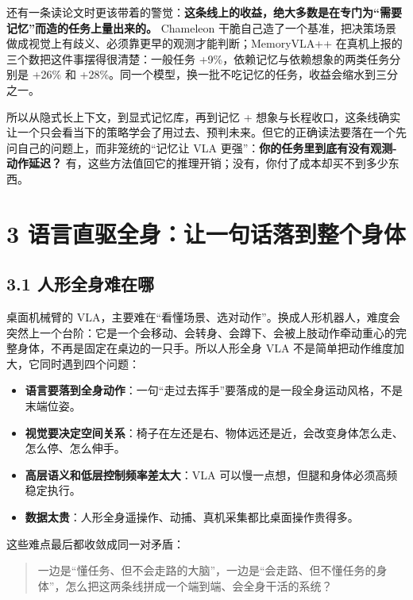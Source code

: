 \documentclass[
  chinese,
]{ctexart}
\providecommand{\tightlist}{%
  \setlength{\itemsep}{0pt}\setlength{\parskip}{0pt}}
\begin{document}
还有一条读论文时更该带着的警觉：\textbf{这条线上的收益，绝大多数是在专门为``需要记忆''而造的任务上量出来的。}
Chameleon
干脆自己造了一个基准，把决策场景做成视觉上有歧义、必须靠更早的观测才能判断；MemoryVLA++
在真机上报的三个数把这件事摆得很清楚：一般任务
+9\%，依赖记忆与依赖想象的两类任务分别是 +26\% 和
+28\%。同一个模型，换一批不吃记忆的任务，收益会缩水到三分之一。

所以从隐式长上下文，到显式记忆库，再到记忆 +
想象与长程收口，这条线确实让一个只会看当下的策略学会了用过去、预判未来。但它的正确读法要落在一个先问自己的问题上，而非笼统的``记忆让
VLA 更强''：\textbf{你的任务里到底有没有观测-动作延迟？}
有，这些方法值回它的推理开销；没有，你付了成本却买不到多少东西。

\section{3
语言直驱全身：让一句话落到整个身体}\label{ux8bedux8a00ux76f4ux9a71ux5168ux8eabux8ba9ux4e00ux53e5ux8bddux843dux5230ux6574ux4e2aux8eabux4f53}

\subsection{3.1
人形全身难在哪}\label{ux4ebaux5f62ux5168ux8eabux96beux5728ux54ea}

桌面机械臂的
VLA，主要难在``看懂场景、选对动作''。换成人形机器人，难度会突然上一个台阶：它是一个会移动、会转身、会蹲下、会被上肢动作牵动重心的完整身体，不再是固定在桌边的一只手。所以人形全身
VLA 不是简单把动作维度加大，它同时遇到四个问题：

\begin{itemize}
\tightlist
\item
  \textbf{语言要落到全身动作}：一句``走过去挥手''要落成的是一段全身运动风格，不是末端位姿。
\item
  \textbf{视觉要决定空间关系}：椅子在左还是右、物体远还是近，会改变身体怎么走、怎么停、怎么伸手。
\item
  \textbf{高层语义和低层控制频率差太大}：VLA
  可以慢一点想，但腿和身体必须高频稳定执行。
\item
  \textbf{数据太贵}：人形全身遥操作、动捕、真机采集都比桌面操作贵得多。
\end{itemize}

这些难点最后都收敛成同一对矛盾：

\begin{quote}
一边是``懂任务、但不会走路的大脑''，一边是``会走路、但不懂任务的身体''，怎么把这两条线拼成一个端到端、会全身干活的系统？
\end{quote}
\end{document}
